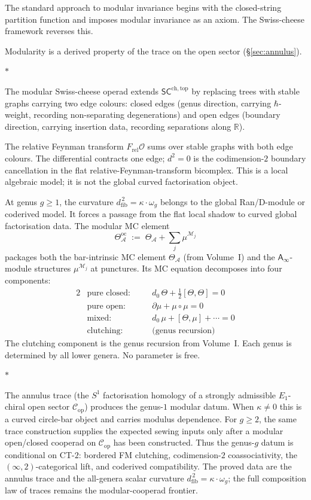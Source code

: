 \documentclass[11pt]{article}
\newcommand{\cA}{\mathcal{A}}
\newcommand{\cC}{\mathcal{C}}
\newcommand{\cM}{\mathcal{M}}
\newcommand{\cO}{\mathcal{O}}
\newcommand{\R}{\mathbb{R}}
\newcommand{\Ainf}{\mathsf{A}_{\infty}}
\newcommand{\SCchtop}{\mathsf{SC}^{\mathrm{ch,top}}}
\newcommand{\dfib}{d_{\mathrm{fib}}}
\newcommand{\sep}{\bigskip\begin{center}$*$\end{center}\medskip}
\begin{document}
The standard approach to modular invariance begins with the
closed-string partition function and imposes modular invariance
as an axiom.  The Swiss-cheese framework reverses this.

Modularity is a derived property of the trace on the open sector
(\S\ref{sec:annulus}).

\sep

The modular Swiss-cheese operad extends $\SCchtop$ by replacing
trees with stable graphs carrying two edge colours: closed
edges (genus direction, carrying $\hbar$-weight, recording
non-separating degenerations) and open edges (boundary direction,
carrying insertion data, recording separations along $\R$).

The relative Feynman transform $F_{\mathrm{rel}}\cO$ sums over
stable graphs with both edge colours.  The differential contracts
one edge; $d^2 = 0$ is the codimension-$2$ boundary cancellation
in the flat relative-Feynman-transform bicomplex.  This is a
local algebraic model; it is not the global curved factorisation
object.

At genus $g \geq 1$, the curvature
$\dfib^{\,2} = \kappa \cdot \omega_g$ belongs to the global
Ran/D-module or coderived model.  It forces a passage from the
flat local shadow to curved global factorisation data.  The
modular MC element
\begin{equation}\label{eq:oc-mc-wn}
\Theta^{\mathrm{oc}}_\cA
\;:=\;
\Theta_\cA + \sum_{j} \mu^{\cM_j}
\end{equation}
packages both the bar-intrinsic MC element $\Theta_\cA$ (from
Volume~I) and the $\Ainf$-module structures $\mu^{\cM_j}$ at
punctures.  Its MC equation decomposes into four components:
\begin{alignat*}{2}
&\text{pure closed:} &&\quad d_0\,\Theta
  + \tfrac{1}{2}[\Theta, \Theta] = 0 \\[3pt]
&\text{pure open:} &&\quad \partial\mu
  + \mu \circ \mu = 0 \\[3pt]
&\text{mixed:} &&\quad d_0\,\mu
  + [\Theta, \mu] + \cdots = 0 \\[3pt]
&\text{clutching:} &&\quad \text{(genus recursion)}
\end{alignat*}
The clutching component is the genus recursion from Volume~I.
Each genus is determined by all lower genera.  No parameter
is free.

\sep

The annulus trace (the $S^1$ factorisation homology of a strongly
admissible $E_1$-chiral open sector $\cC_{\mathrm{op}}$) produces
the genus-$1$ modular datum.  When $\kappa\ne0$ this is a curved
circle-bar object and carries modulus dependence.
For $g\ge2$, the same trace construction supplies the expected
sewing inputs only after a modular open/closed cooperad on
$\cC_{\mathrm{op}}$ has been constructed.  Thus the genus-$g$
datum is conditional on CT-$2$: bordered FM clutching,
codimension-$2$ coassociativity, the $(\infty,2)$-categorical
lift, and coderived compatibility.  The proved data are the
annulus trace and the all-genera scalar curvature
$\dfib^{\,2}=\kappa\cdot\omega_g$; the full composition law of
traces remains the modular-cooperad frontier.
\end{document}
